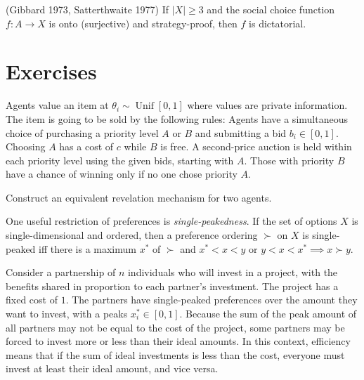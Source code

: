 \documentclass[10pt]{article}
\begin{document}
\begin{spacing}{1.0}
\begin{theorem}
  (Gibbard 1973, Satterthwaite 1977) If  $|X| \geq 3$ and
  the social choice function $f: A \to X$ is onto (surjective) and
  strategy-proof, then $f$ is dictatorial.
\end{theorem}

\newpage
\section{Exercises}
\label{sec:exercises}

\begin{exercise}

  Agents value an item at $\theta_i \sim \operatorname{Unif}[0,1]$ where values are
  private information. The item is going to be sold by the following rules: Agents
  have a simultaneous choice of purchasing a priority level $A$ or $B$ and submitting
  a bid $b_i \in [0,1]$. Choosing $A$ has a cost of $c$ while $B$ is free. A
  second-price auction is held within each priority level using the given bids,
  starting with $A$. Those with priority $B$ have a chance of winning only if no one
  chose priority $A$.

  \vspace{.5em}
  Construct an equivalent revelation mechanism for two agents.
  
\end{exercise}

\begin{exercise}[Sprumont 1991]
  One useful restriction of preferences is \emph{single-peakedness}. If the
  set of options $X$ is single-dimensional and ordered, then a preference
  ordering $\succ$ on $X$ is single-peaked iff there is a maximum $x^*$ of
  $\succ$ and $x^* < x < y$ or $y < x < x^* \implies x \succ y$.

  \vspace{.5em}
  Consider a partnership of $n$ individuals who will invest in a project,
  with the benefits shared in proportion to each partner's investment. The
  project has a fixed cost of $1$. The partners have single-peaked
  preferences over the amount they want to invest, with a peaks $x_i^* \in
  [0,1]$. Because the sum of the peak amount of all partners may not be
  equal to the cost of the project, some partners may be forced to invest
  more or less than their ideal amounts. In this context, efficiency means
  that if the sum of ideal investments is less than the cost, everyone must
  invest at least their ideal amount, and vice versa.


\end{exercise}
\end{spacing}
\end{document}
